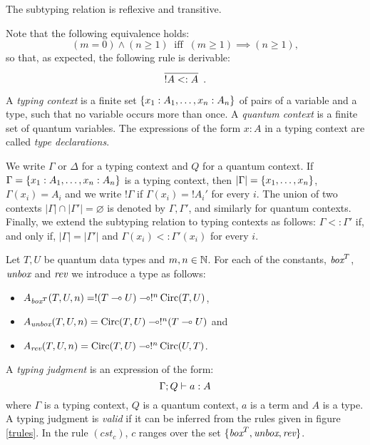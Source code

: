\documentclass[twoside]{article}
\begin{document}
\begin{proposition}
The subtyping relation is reflexive and transitive.
\end{proposition}

Note that the following equivalence holds: 
\[
(m=0)\wedge (n\geq 1) 
~\mbox{ iff }~ 
(m\geq 1) \implies (n\geq 1),
\]
so that, as expected, the following rule is derivable:
\[
  \infer[]{!A <: A}{}
  .
\]

\begin{definition}
A \emph{typing context} is a finite set 
$\{x_1:A_1,\ldots,x_n:A_n\}$ of pairs of a variable and 
a type, such that no variable occurs more than once. A 
\emph{quantum context} is a finite set of quantum variables. 
The expressions of the form $x:A$ in a typing context are 
called \emph{type declarations}.	
\end{definition}

We write $\Gamma$ or $\Delta$ for a typing context and $Q$ for 
a quantum context. If $\Gamma =\{x_1:A_1,\ldots,x_n:A_n\}$ is 
a typing context, then $|\Gamma|=\{x_1,\ldots,x_n\}$, 
$\Gamma (x_i)=A_i$ and we write $!\Gamma$ if $\Gamma(x_i)=!A_i'$ 
for every $i$. The union of two contexts 
$|\Gamma|\cap  |\Gamma'|=\varnothing$ is denoted by $\Gamma,\Gamma'$, 
and similarly for quantum contexts. Finally, we extend the subtyping 
relation to typing contexts as follows: $\Gamma <: \Gamma'$ if, and 
only if, $|\Gamma | = |\Gamma'|$ and $\Gamma (x_i)<: \Gamma' (x_i)$ 
for every $i$.

\begin{definition}
Let $T,U$ be quantum data types and $m,n\in\mathbb{N}$. For each of the constants, 
$\mathop{\textit{box}}\nolimits^T$, $\mathop{\textit{unbox}}\nolimits$ and $\mathop{\textit{rev}}\nolimits$ we introduce a type as follows:
\begin{itemize}
  \item $A_{\mathop{\textit{box}}\nolimits^T}(T,U,n)=!(T\multimap U)\multimap !^n\mathop{\textrm{Circ}}\nolimits(T,U)$,
  \item $A_{\mathop{\textit{unbox}}\nolimits}(T,U,n)=\mathop{\textrm{Circ}}\nolimits(T,U)\multimap !^n(T\multimap U)$ and
  \item $A_{\mathop{\textit{rev}}\nolimits}(T,U,n)=\mathop{\textrm{Circ}}\nolimits(T,U) \multimap !^n\mathop{\textrm{Circ}}\nolimits(U,T)$.
\end{itemize}
\end{definition}

\begin{definition}
A \emph{typing judgment} is an expression of the form:
\[
\Gamma ; Q \vdash a:A
\] 
where $\Gamma$ is a typing context, $Q$ is a quantum context, 
$a$ is a term and $A$ is a type. A typing judgment is \emph{valid} if 
it can be inferred from the rules given in figure 
\hyperref[trules]{\ref*{trules}}. In the rule $(cst_c)$, 
$c$ ranges over the set $\{\mathop{\textit{box}}\nolimits^T, \mathop{\textit{unbox}}\nolimits, \mathop{\textit{rev}}\nolimits\}$.
\end{definition}
\end{document}
